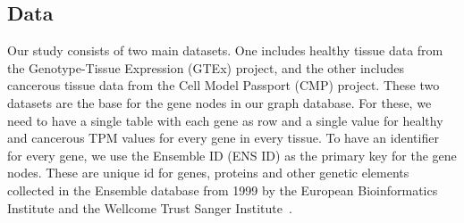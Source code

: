 \subsection{Data} \label{subsec:data}

Our study consists of two main datasets.
One includes healthy tissue data from the Genotype-Tissue Expression (GTEx) project,
and the other includes cancerous tissue data from the Cell Model Passport (CMP) project. %
These two datasets are the base for the gene nodes in our graph database.
For these, we need to have a single table with each gene as row and a single value for healthy and cancerous TPM values for every gene in every tissue.
To have an identifier for every gene, we use the Ensemble ID (ENS ID) as the primary key for the gene nodes.
These are unique id for genes, proteins and other genetic elements collected in the Ensemble database
from 1999 by the European Bioinformatics Institute and the Wellcome Trust Sanger Institute~\cite{ensembl_project}.
\\


